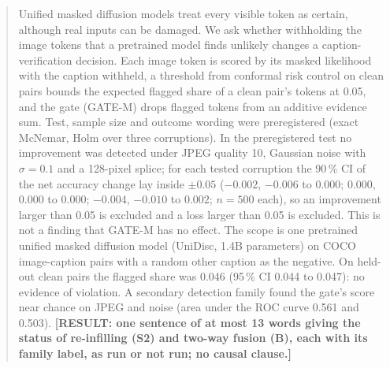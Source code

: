 \documentclass[preprint,12pt]{elsarticle}
\newcommand{\todo}[1]{{\color{red}\textbf{[#1]}}}
\theoremstyle{plain}
\theoremstyle{definition}
\begin{document}
\begin{frontmatter}
\begin{abstract}
Unified masked diffusion models treat every visible token as certain, although real inputs can be damaged.
We ask whether withholding the image tokens that a pretrained model finds unlikely changes a caption-verification decision.
Each image token is scored by its masked likelihood with the caption withheld, a threshold from conformal risk control on clean pairs
bounds the expected flagged share of a clean pair's tokens at 0.05, and the gate (GATE-M) drops flagged tokens from an additive
evidence sum.
Test, sample size and outcome wording were preregistered (exact McNemar, Holm over three corruptions).
In the preregistered test no improvement was detected under JPEG quality 10, Gaussian noise with $\sigma=0.1$ and a 128-pixel splice;
for each tested corruption the 90\,\% CI of the net accuracy change lay inside $\pm0.05$ ($-0.002$, $-0.006$ to $0.000$; $0.000$,
$0.000$ to $0.000$; $-0.004$, $-0.010$ to $0.002$; $n=500$ each), so an improvement larger than 0.05 is excluded and a loss larger than
0.05 is excluded.
This is not a finding that GATE-M has no effect.
The scope is one pretrained unified masked diffusion model (UniDisc, 1.4B parameters) on COCO image-caption pairs with a random other
caption as the negative.
On held-out clean pairs the flagged share was 0.046 (95\,\% CI 0.044 to 0.047): no evidence of violation.
A secondary detection family found the gate's score near chance on JPEG and noise (area under the ROC curve 0.561 and 0.503).
\todo{RESULT: one sentence of at most 13 words giving the status of re-infilling (S2) and two-way fusion (B), each with its family
label, as run or not run; no causal clause.}
\end{abstract}


\end{frontmatter}
\end{document}
